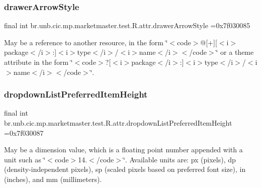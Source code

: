 \subsubsection{\texorpdfstring{drawer\+Arrow\+Style}{drawerArrowStyle}}
{\footnotesize\ttfamily final int br.\+unb.\+cic.\+mp.\+marketmaster.\+test.\+R.\+attr.\+drawer\+Arrow\+Style =0x7f030085\hspace{0.3cm}{\ttfamily [static]}}

May be a reference to another resource, in the form \char`\"{}$<$code$>$@\mbox{[}+\mbox{]}\mbox{[}$<$i$>$package$<$/i$>$\+:\mbox{]}$<$i$>$type$<$/i$>$/$<$i$>$name$<$/i$>$$<$/code$>$\char`\"{} or a theme attribute in the form \char`\"{}$<$code$>$?\mbox{[}$<$i$>$package$<$/i$>$\+:\mbox{]}$<$i$>$type$<$/i$>$/$<$i$>$name$<$/i$>$$<$/code$>$\char`\"{}. \mbox{\label{classbr_1_1unb_1_1cic_1_1mp_1_1marketmaster_1_1test_1_1R_1_1attr_a67dfe7f0a7b1e98fd129c41a24908037}} 
\subsubsection{\texorpdfstring{dropdown\+List\+Preferred\+Item\+Height}{dropdownListPreferredItemHeight}}
{\footnotesize\ttfamily final int br.\+unb.\+cic.\+mp.\+marketmaster.\+test.\+R.\+attr.\+dropdown\+List\+Preferred\+Item\+Height =0x7f030087\hspace{0.3cm}{\ttfamily [static]}}

May be a dimension value, which is a floating point number appended with a unit such as \char`\"{}$<$code$>$14.\+5sp$<$/code$>$\char`\"{}. Available units are\+: px (pixels), dp (density-\/independent pixels), sp (scaled pixels based on preferred font size), in (inches), and mm (millimeters). \mbox{\label{classbr_1_1unb_1_1cic_1_1mp_1_1marketmaster_1_1test_1_1R_1_1attr_a358a9bd4fea09db69c473c50b6ba30cf}} 
